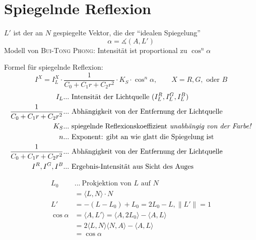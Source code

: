 \section{Spiegelnde Reflexion}
\begin{center}
\end{center}

$L'$ ist der an $N$ gespiegelte Vektor, die der "`idealen Spiegelung"'
\[\alpha = \measuredangle(A,L')\]
Modell von \textsc{Bui-Tong Phong}: Intensität ist proportional zu $\cos^n \alpha$
\begin{center}
\end{center}
\begin{center}
\end{center}
Formel für spiegelnde Reflexion:
\[I^X = I^X_L \cdot \frac{1}{C_0 + C_1 r + C_2 r^2} \cdot K_S \cdot \cos^n \alpha,\qquad X = R, G, \text{ oder } B\]
\begin{align*}
	I_L...\ & \text{Intensität der Lichtquelle $(I_L^R, I_L^G, I_L^B)$}\\
	\frac{1}{C_0 + C_1 r + C_2 r^2}...\ & \text{Abhängigkeit von der Entfernung der Lichtquelle}\\
	K_S...\ & \text{spiegelnde Reflexionskoeffizient \emph{unabhängig von der Farbe!}}\\
	n...\ & \text{Exponent: gibt an wie glatt die Spiegelung ist}\\
	\frac{1}{C_0 + C_1 r + C_2 r^2}...\ & \text{Abhängigkeit von der Entfernung der Lichtquelle}\\
	I^R, I^G, I^B...\ & \text{Ergebnis-Intensität aus Sicht des Auges}\\
\end{align*}
\begin{center}
\end{center}
\begin{align*}
 L_0&...\ \text{Prokjektion von $L$ auf $N$}\\
    &= \langle L, N \rangle \cdot N\\
 L' &= -(L-L_0) + L_0 = 2L_0 - L, \|L'\|=1\\
 \cos \alpha &= \langle A, L' \rangle =  \langle A, 2L_0 \rangle -  \langle A, L \rangle\\
  &= 2  \langle L, N \rangle \langle N, A \rangle -  \langle A, L \rangle\\
	&= \cos \alpha
\end{align*}
